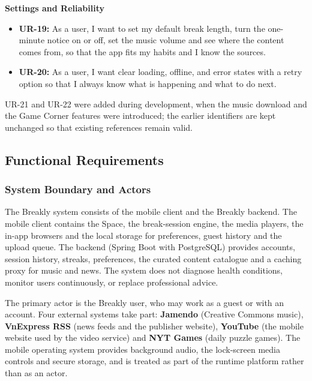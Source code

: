 \medskip\noindent\textbf{Settings and Reliability}\par\nopagebreak
\begin{itemize}
  \item \textbf{UR-19:} As a user, I want to set my default break length,
        turn the one-minute notice on or off, set the music volume and see
        where the content comes from, so that the app fits my habits and I
        know the sources.
  \item \textbf{UR-20:} As a user, I want clear loading, offline, and error
        states with a retry option so that I always know what is happening and
        what to do next.
\end{itemize}

UR-21 and UR-22 were added during development, when the music download and
the Game Corner features were introduced; the earlier identifiers are kept
unchanged so that existing references remain valid.

\subsection{Functional Requirements}
\label{sec:functional-requirements}

\subsubsection{System Boundary and Actors}
\label{sec:system-boundary}

The Breakly system consists of the mobile client and the Breakly backend. The
mobile client contains the Space, the break-session engine, the media players,
the in-app browsers and the local storage for preferences, guest history and
the upload queue. The backend (Spring Boot with PostgreSQL) provides accounts,
session history, streaks, preferences, the curated content catalogue and a
caching proxy for music and news. The system does not diagnose health
conditions, monitor users continuously, or replace professional advice.

The primary actor is the Breakly user, who may work as a guest or with an
account. Four external systems take part: \textbf{Jamendo} (Creative Commons
music), \textbf{VnExpress RSS} (news feeds and the publisher website),
\textbf{YouTube} (the mobile website used by the video service) and
\textbf{NYT Games} (daily puzzle games). The mobile operating system provides
background audio, the lock-screen media controls and secure storage, and is
treated as part of the runtime platform rather than as an actor.

